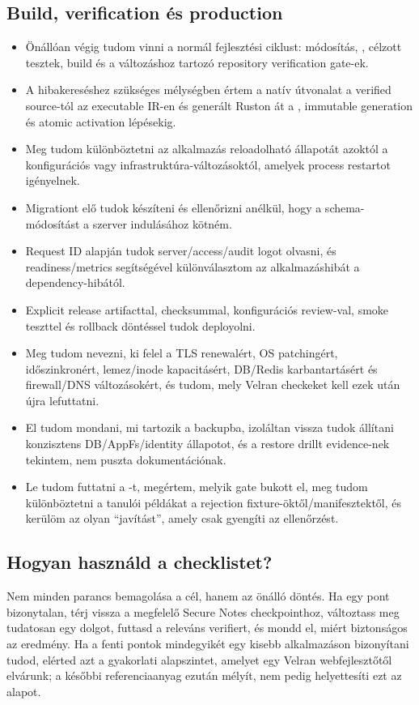 \subsection*{Build, verification és production}
\begin{itemize}[label={\texttt{[ ]}},leftmargin=2em]
  \item Önállóan végig tudom vinni a normál fejlesztési ciklust: módosítás, , célzott tesztek, build és a változáshoz tartozó repository verification gate-ek.
  \item A hibakereséshez szükséges mélységben értem a natív útvonalat a verified source-tól az executable IR-en és generált Ruston át a , immutable generation és atomic activation lépésekig.
  \item Meg tudom különböztetni az alkalmazás reloadolható állapotát azoktól a konfigurációs vagy infrastruktúra-változásoktól, amelyek process restartot igényelnek.
  \item Migrationt elő tudok készíteni és ellenőrizni anélkül, hogy a schema-módosítást a szerver indulásához kötném.
  \item Request ID alapján tudok server/access/audit logot olvasni, és readiness/metrics segítségével különválasztom az alkalmazáshibát a dependency-hibától.
  \item Explicit release artifacttal, checksummal, konfigurációs review-val, smoke teszttel és rollback döntéssel tudok deployolni.
  \item Meg tudom nevezni, ki felel a TLS renewalért, OS patchingért, időszinkronért, lemez/inode kapacitásért, DB/Redis karbantartásért és firewall/DNS változásokért, és tudom, mely Velran checkeket kell ezek után újra lefuttatni.
  \item El tudom mondani, mi tartozik a backupba, izoláltan vissza tudok állítani konzisztens DB/AppFs/identity állapotot, és a restore drillt evidence-nek tekintem, nem puszta dokumentációnak.
  \item Le tudom futtatni a -t, megértem, melyik gate bukott el, meg tudom különböztetni a tanulói példákat a rejection fixture-öktől/manifesztektől, és kerülöm az olyan ``javítást'', amely csak gyengíti az ellenőrzést.
\end{itemize}

\subsection*{Hogyan használd a checklistet?}
Nem minden parancs bemagolása a cél, hanem az önálló döntés. Ha egy pont bizonytalan, térj vissza a megfelelő Secure Notes checkpointhoz, változtass meg tudatosan egy dolgot, futtasd a releváns verifiert, és mondd el, miért biztonságos az eredmény. Ha a fenti pontok mindegyikét egy kisebb alkalmazáson bizonyítani tudod, elérted azt a gyakorlati alapszintet, amelyet egy Velran webfejlesztőtől elvárunk; a későbbi referenciaanyag ezután mélyít, nem pedig helyettesíti ezt az alapot.

